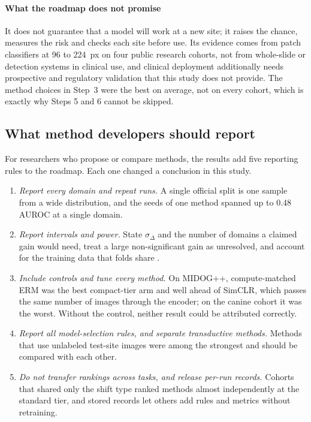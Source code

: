 \paragraph{What the roadmap does not promise} It does not guarantee that a
model will work at a new site; it raises the chance, measures the risk and
checks each site before use. Its
evidence comes from patch classifiers at 96 to 224~px on four public research
cohorts, not from whole-slide or detection systems in clinical use, and clinical
deployment additionally needs prospective and regulatory validation that this
study does not provide. The method choices in Step~3 were the best on average,
not on every cohort, which is exactly why Steps 5 and 6 cannot be skipped.

\subsection{What method developers should report}
\label{sec:disc-research}

For researchers who propose or compare methods, the results add five reporting
rules to the roadmap. Each one changed a conclusion in this study.
\begin{enumerate}
  \item \emph{Report every domain and repeat runs.} A single official split is
    one sample from a wide distribution, and the seeds of one method spanned
    up to 0.48 AUROC at a single domain.
  \item \emph{Report intervals and power.} State $\sigma_\Delta$ and the
    number of domains a claimed gain would need, treat a large non-significant
    gain as unresolved, and account for the training data that folds share
    \citep{nadeau2003inference,bates2023cv}.
  \item \emph{Include controls and tune every method.} On MIDOG++,
    compute-matched ERM was the best compact-tier arm and well ahead of
    SimCLR, which passes the same number of images through the encoder; on
    the canine cohort it was the worst. Without the control, neither result
    could be attributed correctly.
  \item \emph{Report all model-selection rules, and separate transductive
    methods.} Methods that use unlabeled test-site images were among the
    strongest and should be compared with each other.
  \item \emph{Do not transfer rankings across tasks, and release per-run
    records.} Cohorts that shared only the shift type ranked methods almost
    independently at the standard tier, and stored records let others add
    rules and metrics without retraining.
\end{enumerate}

